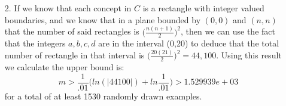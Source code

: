\documentclass[11pt,a4paper]{article}
\begin{document}
\begin{itemize}
\begin{enumerate} [label={\alph*)}]
					$$\displaystyle\sum_{k=1}^{N} 3^k{N \choose k}$$
					
					\item From Occam's Razor we have $$m > \frac{1}{\epsilon} \Big( ln(\vert H \vert) + ln\frac{1}{\delta}\Big)$$
					Having calculated our hypothesis spaces in parts a and b, and knowing that the experienced worker is making the products (taking the hypothesis space from part b) we have that $H=\displaystyle\sum_{k=1}^{6} 3^k{6 \choose k}=4095$, and substituting in what we know yields the following:
					$$m > \frac{1}{.01} \Big( ln(\vert 4095 \vert) + ln\frac{1}{.01}\Big) > 1.292269e+03 $$
					for a total of at least 1293 examples.
					
				\end{enumerate}
				
			\item [2.]
				If we know that each concept in $C$ is a rectangle with integer valued boundaries, and we know that in a plane bounded by $(0,0)$ and $(n,n)$ that the number of said rectangles is $\Big( \frac{n(n+1)}{2} \Big)^2$, then we can use the fact that the integers $a,b,c,d$ are in the interval (0,20) to deduce that the total number of rectangle in that interval is $\Big( \frac{20(21)}{2} \Big)^2 = 44,100$. Using this result we calculate the upper bound is:
				$$m > \frac{1}{.01} \Big( ln(\vert 44100 \vert) + ln\frac{1}{.01}\Big) > 1.529939e+03 $$
				for a total of at least 1530 randomly drawn examples.
		\end{itemize}
		
\end{document}
